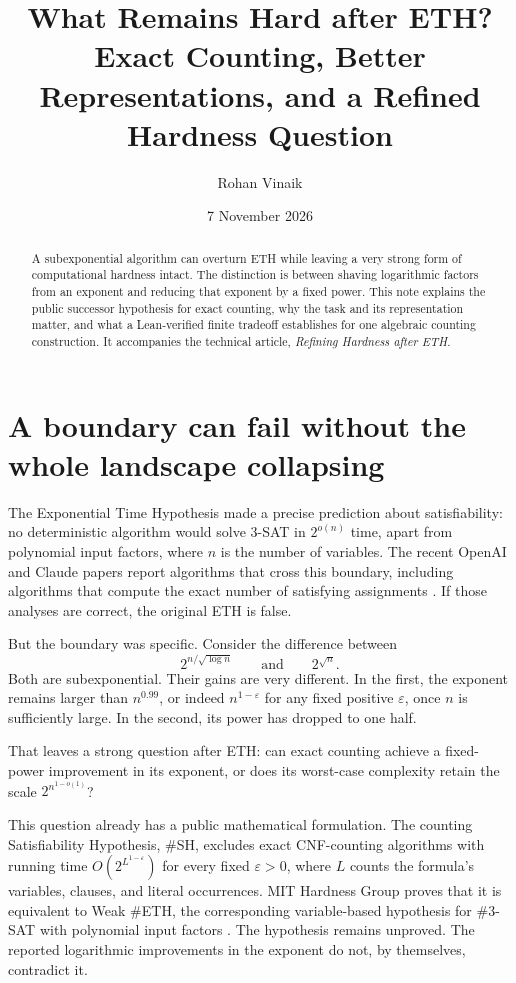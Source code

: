 \documentclass[11pt,letterpaper]{article}
\title{What Remains Hard after ETH?\\[0.5em]{\large Exact Counting,
Better Representations, and a Refined Hardness Question}}
\author{Rohan Vinaik}
\date{\small 7 November 2026}
\begin{document}
\maketitle
\begin{abstract}
A subexponential algorithm can overturn ETH while leaving a very strong
form of computational hardness intact. The distinction is between
shaving logarithmic factors from an exponent and reducing that exponent
by a fixed power. This note explains the public successor hypothesis for
exact counting, why the task and its representation matter, and what a
Lean-verified finite tradeoff establishes for one algebraic counting
construction. It accompanies the technical article,
\emph{Refining Hardness after ETH}.
\end{abstract}
\section{A boundary can fail without the whole landscape
collapsing}\label{a-boundary-can-fail-without-the-whole-landscape-collapsing}

The Exponential Time Hypothesis made a precise prediction about
satisfiability: no deterministic algorithm would solve 3-SAT in
\(2^{o(n)}\) time, apart from polynomial input factors, where \(n\) is
the number of variables. The recent OpenAI and Claude papers report
algorithms that cross this boundary, including algorithms that compute
the exact number of satisfying assignments \citep{O26, Ant26}. If those
analyses are correct, the original ETH is false.

But the boundary was specific. Consider the difference between
\[2^{n/\sqrt{\log n}}\qquad\text{and}\qquad2^{\sqrt n}.\] Both are
subexponential. Their gains are very different. In the first, the
exponent remains larger than \(n^{0.99}\), or indeed
\(n^{1-\varepsilon}\) for any fixed positive \(\varepsilon\), once \(n\)
is sufficiently large. In the second, its power has dropped to one half.

That leaves a strong question after ETH: can exact counting achieve a
fixed-power improvement in its exponent, or does its worst-case
complexity retain the scale \(2^{n^{1-o(1)}}\)?

This question already has a public mathematical formulation. The
counting Satisfiability Hypothesis, \#SH, excludes exact CNF-counting
algorithms with running time \(O(2^{L^{1-\varepsilon}})\) for every
fixed \(\varepsilon>0\), where \(L\) counts the formula's variables,
clauses, and literal occurrences. MIT Hardness Group proves that it is
equivalent to Weak \#ETH, the corresponding variable-based hypothesis
for \#3-SAT with polynomial input factors \citep{SH26}. The hypothesis
remains unproved. The reported logarithmic improvements in the exponent
do not, by themselves, contradict it.
\end{document}
